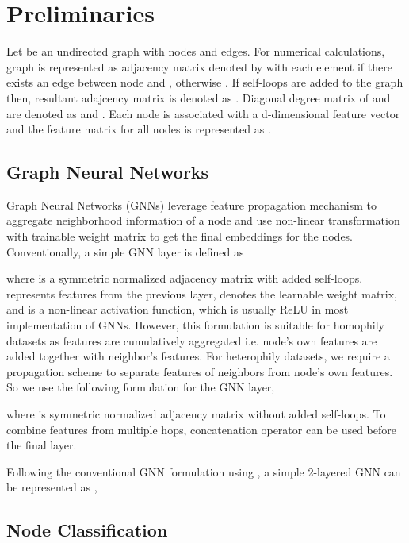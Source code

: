 \documentclass[sigconf,natbib=false]{acmart}
\begin{document}
\section{Preliminaries}
\label{preliminaries}

Let  be an undirected graph with  nodes and  edges. For numerical calculations, graph is represented as adjacency matrix denoted by  with each element  if there exists an edge between node  and , otherwise . If self-loops are added to the graph then, resultant adajcency matrix is denoted as . Diagonal degree matrix of  and  are denoted as  and . Each node is associated with a d-dimensional feature vector and the feature matrix for all nodes is represented as .

\subsection{Graph Neural Networks}

Graph Neural Networks (GNNs) leverage feature propagation mechanism \cite{gilmer_neural_2017} to aggregate neighborhood information of a node and use non-linear transformation with trainable weight matrix to get the final embeddings for the nodes. Conventionally, a simple GNN layer is defined as 


where  is a symmetric normalized adjacency matrix with added self-loops.  represents features from the previous layer,  denotes the learnable weight matrix, and  is a non-linear activation function, which is usually ReLU in most implementation of GNNs. However, this formulation is suitable for homophily datasets as features are cumulatively aggregated i.e. node's own features are added together with neighbor's features. For heterophily datasets, we require a propagation scheme to separate features of neighbors from node's own features. So we use the following formulation for the GNN layer,


where  is symmetric normalized adjacency matrix without added self-loops. To combine features from multiple hops, concatenation operator can be used before the final layer.

Following the conventional GNN formulation using , a simple 2-layered GNN can be represented as \cite{kipf_semi-supervised_2017},



\subsection{Node Classification}
\end{document}
